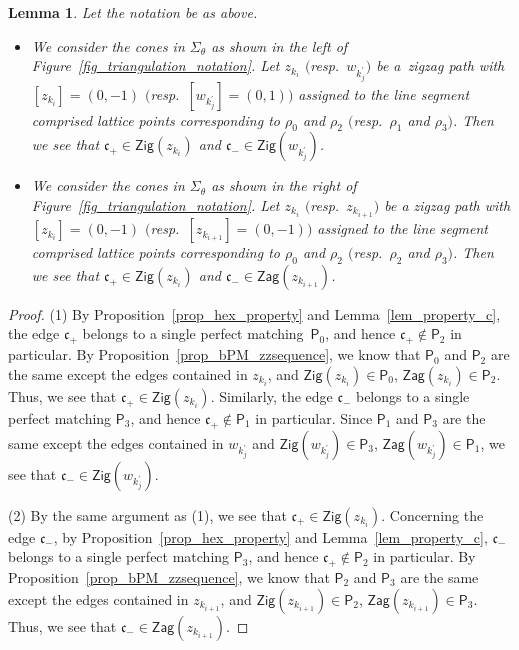 \documentclass[10pt,a4paper]{amsart}
\numberwithin{equation}{section}
\newtheorem{Lemma}[Theorem]{Lemma}
\theoremstyle{definition}
\newcommand{\fkc}{\mathfrak{c}}
\newcommand{\sfP}{\mathsf{P}}
\newcommand{\Zig}{\mathsf{Zig}}
\newcommand{\Zag}{\mathsf{Zag}}
\begin{document}
\begin{Lemma}\label{lem_zigzag_containPM}
Let the notation be as above.
\begin{itemize}\itemsep=0pt
\item[$(1)$] We consider the cones in $\Sigma_\theta$ as shown in the left of {\rm Figure~\ref{fig_triangulation_notation}}.
Let $z_{k_i}$ $($resp.\ $w_{k^\prime_j})$ be a~zigzag path with $[z_{k_i}]=(0,-1)$ $($resp.\ $[w_{k^\prime_j}]=(0,1))$ assigned to the line segment comprised lattice points
corresponding to $\rho_0$ and $\rho_2$ $($resp.\ $\rho_1$ and $\rho_3)$.
Then we see that $\fkc_+\in\Zig(z_{k_i})$ and $\fkc_-\in \Zig(w_{k^\prime_j})$.
\item[$(2)$] We consider the cones in $\Sigma_\theta$ as shown in the right of {\rm Figure~\ref{fig_triangulation_notation}}.
Let $z_{k_i}$ $($resp.\ $z_{k_{i+1}})$ be a zigzag path with $[z_{k_i}]=(0,-1)$ $($resp.\ $[z_{k_{i+1}}]=(0,-1))$ assigned to the line segment comprised lattice points
corresponding to $\rho_0$ and $\rho_2$ $($resp.\ $\rho_2$ and $\rho_3)$.
Then we see that $\fkc_+\in\Zig(z_{k_i})$ and $\fkc_-\in \Zag(z_{k_{i+1}})$.
\end{itemize}
\end{Lemma}

\begin{proof} (1)
By Proposition~\ref{prop_hex_property} and Lemma~\ref{lem_property_c}, the edge $\fkc_+$ belongs to a single perfect matching~$\sfP_0$,
and hence $\fkc_+\not\in\sfP_2$ in particular.
By Proposition~\ref{prop_bPM_zzsequence}, we know that $\sfP_0$ and $\sfP_2$ are the same except the edges contained in $z_{k_i}$,
and $\Zig(z_{k_i})\in\sfP_0$, $\Zag(z_{k_i})\in\sfP_2$.
Thus, we see that $\fkc_+\in\Zig(z_{k_i})$.
Similarly, the edge $\fkc_-$ belongs to a single perfect matching $\sfP_3$, and hence $\fkc_+\not\in\sfP_1$ in particular.
Since $\sfP_1$ and $\sfP_3$ are the same except the edges contained in $w_{k^\prime_j}$
and $\Zig(w_{k^\prime_j})\in\sfP_3$, $\Zag(w_{k^\prime_j})\in\sfP_1$, we see that $\fkc_-\in \Zig(w_{k^\prime_j})$.

(2) By the same argument as (1), we see that $\fkc_+\in\Zig(z_{k_i})$.
Concerning the edge $\fkc_-$, by Proposition~\ref{prop_hex_property} and Lemma~\ref{lem_property_c},
$\fkc_-$ belongs to a single perfect matching $\sfP_3$, and hence $\fkc_+\not\in\sfP_2$ in particular.
By Proposition~\ref{prop_bPM_zzsequence}, we know that $\sfP_2$ and $\sfP_3$ are the same except the edges contained in $z_{k_{i+1}}$,
and $\Zig(z_{k_{i+1}})\in\sfP_2$, $\Zag(z_{k_{i+1}})\in\sfP_3$.
Thus, we see that $\fkc_-\in\Zag(z_{k_{i+1}})$.
\end{proof}
\end{document}
